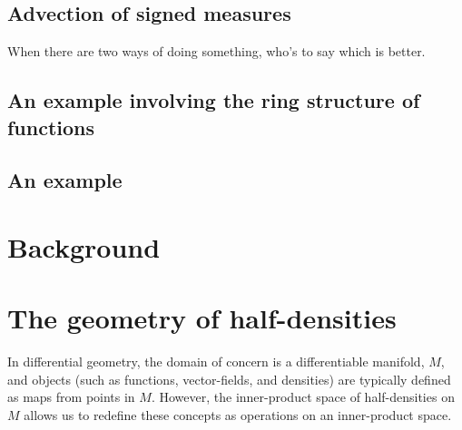 \documentclass[12pt]{amsart}
\begin{document}
\subsection{Advection of signed measures}
\label{sec:signed}
When there are two ways of doing something, who's to say which is better.

\subsection{An example involving the ring structure of functions}


\subsection{An example}

\section{Background}
\label{sec:background}

\section{The geometry of half-densities}
\label{sec:half_densities}

In differential geometry, the domain of concern is
a differentiable manifold, $M$, and objects (such as
functions, vector-fields, and densities) are typically defined
as maps from points in $M$.
However, the inner-product space
of half-densities on $M$ allows us to redefine these concepts
as operations on an inner-product space.
\end{document}
